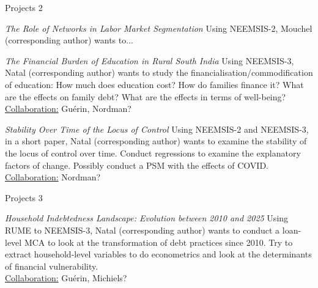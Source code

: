 \documentclass[aspectratio=169]{beamer}
\begin{document}
\begin{frame}{Projects 2}
\begin{scriptsize}

\begin{greenbox}{\textit{The Role of Networks in Labor Market Segmentation}}
Using NEEMSIS-2, Mouchel (corresponding author) wants to...
\end{greenbox}

\begin{greenbox}{\textit{The Financial Burden of Education in Rural South India}}
Using NEEMSIS-3, Natal (corresponding author) wants to study the financialisation/commodification of education: How much does education cost? How do families finance it? What are the effects on family debt? What are the effects in terms of well-being? \\
\underline{Collaboration:} Guérin, Nordman?
\end{greenbox}

\begin{greenbox}{\textit{Stability Over Time of the Locus of Control}}
Using NEEMSIS-2 and NEEMSIS-3, in a short paper, Natal (corresponding author) wants to examine the stability of the locus of control over time. Conduct regressions to examine the explanatory factors of change. Possibly conduct a PSM with the effects of COVID. \\
\underline{Collaboration:} Nordman?
\end{greenbox}


\end{scriptsize}
\end{frame}






\begin{frame}{Projects 3}
\begin{scriptsize}

\begin{greenbox}{\textit{Household Indebtedness Landscape: Evolution between 2010 and 2025}}
Using RUME to NEEMSIS-3, Natal (corresponding author) wants to conduct a loan-level MCA to look at the transformation of debt practices since 2010. Try to extract household-level variables to do econometrics and look at the determinants of financial vulnerability. \\
\underline{Collaboration:} Guérin, Michiels?
\end{greenbox}

\end{scriptsize}
\end{frame}
\end{document}

